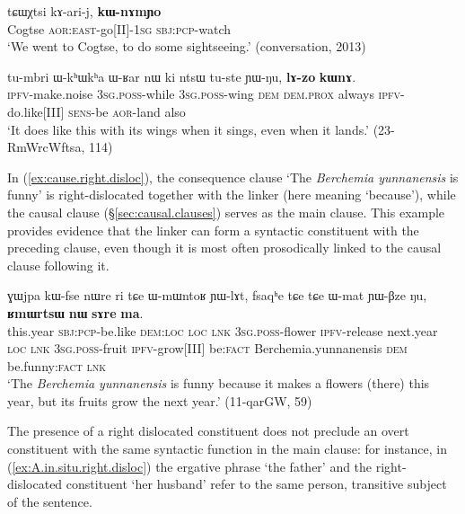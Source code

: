 \begin{exe}
\ex \label{ex:purposive.right.disloc}
\gll tɕɯχtsi kɤ-ari-j, \textbf{kɯ-nɤmɲo} \\
Cogtse \textsc{aor}:\textsc{east}-go[II]-\textsc{1sg} \textsc{sbj}:\textsc{pcp}-watch \\
\glt `We went to Cogtse, to do some sightseeing.' (conversation, 2013)
\end{exe}

\begin{exe}
\ex \label{ex:concessive.cond.right.disloc}
\gll tu-mbri ɯ-kʰɯkʰa ɯ-ʁar nɯ ki ntsɯ tu-ste ɲɯ-ŋu, \textbf{lɤ-zo} \textbf{kɯnɤ}. \\
\textsc{ipfv}-make.noise \textsc{3sg}.\textsc{poss}-while \textsc{3sg}.\textsc{poss}-wing \textsc{dem} \textsc{dem}.\textsc{prox} always \textsc{ipfv}-do.like[III] \textsc{sens}-be \textsc{aor}-land also \\
\glt `It does like this with its wings when it sings, even when it lands.' (23-RmWrcWftsa, 114)
\end{exe}

In (\ref{ex:cause.right.disloc}), the consequence clause  `The \textit{Berchemia yunnanensis} is funny' is right-dislocated together with the linker  (here meaning `because'), while the causal clause (§\ref{sec:causal.clauses}) serves as the main clause. This example provides evidence that the linker  can form a syntactic constituent with the preceding clause, even though it is most often prosodically linked to the causal clause following it.

\begin{exe}
\ex \label{ex:cause.right.disloc}
\gll ɣɯjpa kɯ-fse nɯre ri tɕe ɯ-mɯntoʁ ɲɯ-lɤt, fsaqʰe tɕe tɕe ɯ-mat ɲɯ-βze ŋu, \textbf{ʁmɯrtsɯ} \textbf{nɯ} \textbf{sɤre} \textbf{ma}. \\
this.year \textsc{sbj}:\textsc{pcp}-be.like \textsc{dem}:\textsc{loc} \textsc{loc} \textsc{lnk} \textsc{3sg}.\textsc{poss}-flower \textsc{ipfv}-release next.year \textsc{loc} \textsc{lnk} \textsc{3sg}.\textsc{poss}-fruit \textsc{ipfv}-grow[III] be:\textsc{fact} Berchemia.yunnanensis \textsc{dem} be.funny:\textsc{fact} \textsc{lnk} \\
\glt `The \textit{Berchemia yunnanensis} is funny because it makes a flowers (there) this year, but its fruits grow the next year.' (11-qarGW, 59)
\end{exe}

The presence of a right dislocated constituent does not preclude an overt constituent with the same syntactic function in the main clause: for instance, in (\ref{ex:A.in.situ.right.disloc}) the ergative phrase `the father' and the right-dislocated constituent  `her husband' refer to the same person, transitive subject of the sentence.

